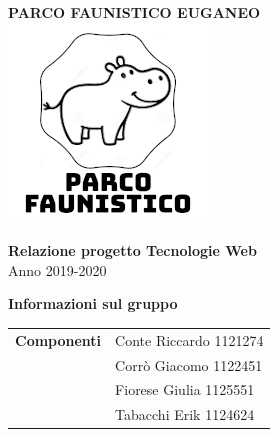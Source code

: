 \begin{center}
	\textbf{\Huge{PARCO FAUNISTICO EUGANEO}}\\
	\vspace{15pt}
	\includegraphics{./img/logo.png}
\end{center}

\vspace{1.5cm}

\begin{center}
	\textbf{\huge{Relazione progetto Tecnologie Web}}\\[0.2cm]
	\Large{Anno 2019-2020}
\end{center}

\vspace{5pt}

\begin{center}
	\textbf{\Large{Informazioni sul gruppo}}
\begin{table}[H]
	\hspace{3.5cm}
	\renewcommand{\arraystretch}{1.4}
	\begin{tabular}{l | l}
		\textbf{Componenti} & Conte Riccardo 1121274\\
		& Corrò Giacomo 1122451\\
		& Fiorese Giulia 1125551\\
		& Tabacchi Erik 1124624\\
	\end{tabular}
\end{table}
\end{center}

\hspace{5pt}

